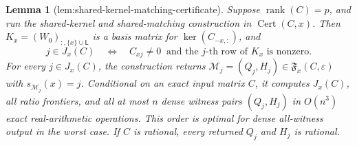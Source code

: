 \documentclass{article}
\newtheorem{lemma}{Lemma}
\begin{document}
\begin{lemma}[lem:shared-kernel-matching-certificate]\label{lem:shared-kernel-matching-certificate}
Suppose \(\operatorname{rank}(C)=p\), and run the shared-kernel and shared-matching construction in \(\operatorname{Cert}(C,x)\). Then \(K_x=(W_0)_{:,\{x\}\cup\mathsf L}\) is a basis matrix for \(\ker(C_{-x,:})\), and
\[
 j\in J_x(C)
 \quad\Longleftrightarrow\quad
 C_{xj}\ne0\ \text{ and the \(j\)-th row of \(K_x\) is nonzero}.
\]
For every \(j\in J_x(C)\), the construction returns \(\mathcal M_j=(Q_j,H_j)\in\mathfrak F_x(C,\varepsilon)\) with \(s_{\mathcal M_j}(x)=j\). Conditional on an exact input matrix \(C\), it computes \(J_x(C)\), all ratio frontiers, and all at most \(n\) dense witness pairs \((Q_j,H_j)\) in \(O(n^3)\) exact real-arithmetic operations. This order is optimal for dense all-witness output in the worst case. If \(C\) is rational, every returned \(Q_j\) and \(H_j\) is rational.
\end{lemma}
\end{document}
